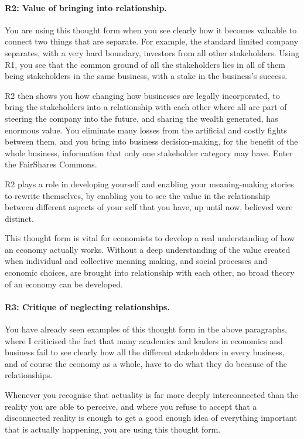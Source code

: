 \paragraph{\textbf{R2: Value of bringing into relationship.}}
You are using this thought form when you see clearly how it becomes valuable to connect two things that are separate. For example, the standard limited company separates, with a very hard boundary, investors from all other stakeholders. Using R1, you see that the common ground of all the stakeholders lies in all of them being stakeholders in the same business, with a stake in the business’s success.


R2 then shows you how changing how businesses are legally incorporated, to bring the stakeholders into a relationship with each other where all are part of steering the company into the future, and sharing the wealth generated, has enormous value. You eliminate many losses from the artificial and costly fights between them, and you bring into business decision-making, for the benefit of the whole business, information that only one stakeholder category may have. Enter the FairShares Commons.


R2 plays a role in developing yourself and enabling your meaning-making stories to rewrite themselves, by enabling you to see the value in the relationship between different aspects of your self that you have, up until now, believed were distinct.


This thought form is vital for economists  to develop a real understanding of how an economy actually works. Without a deep understanding of the value created when individual and collective meaning making, and social processes and economic choices, are brought into relationship with each other, no broad theory of an economy can be developed.
\paragraph{\textbf{R3: Critique of neglecting relationships.}}
You have already seen examples of this thought form in the above paragraphs, where I criticised the fact that many academics and leaders in economics  and business fail to see clearly how all the different stakeholders in every business, and of course the economy as a whole, have to do what they do because of the relationships. 


Whenever you recognise that actuality is far more deeply interconnected than the reality  you are able to perceive, and where you refuse to accept that a disconnected reality is enough to get a good enough idea of everything important that is actually happening, you are using this thought form. 


